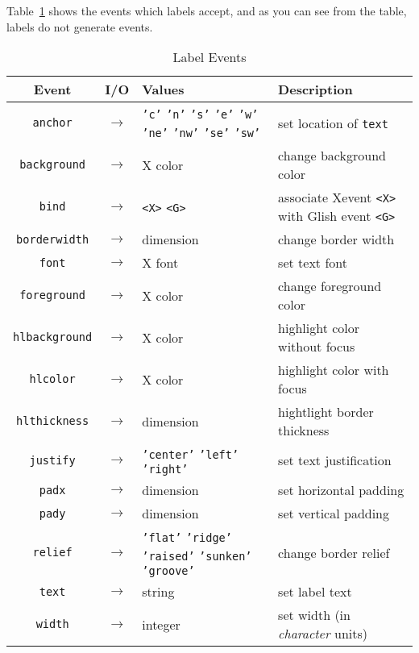 Table~\ref{tklabel-events} shows the events which labels accept, and as you can
see from the table, labels do not generate events.

\begin{table}[tbh]
{\small
\begin{center}
\begin{tabular}{|c|c|p{1.7in}|p{2.0in}|}
\hline
Event & I/O & Values & Description \\
\hline
\hline
{\tt anchor}    &$\rightarrow$& {\tt 'c'} {\tt 'n'} {\tt 's'} {\tt 'e'} {\tt 'w'} {\tt 'ne'} {\tt 'nw'} {\tt 'se'} {\tt 'sw'} & set location of {\tt text} \\ \hline
{\tt background}&$\rightarrow$& X color & change background color \\ \hline
{\tt bind}	&$\rightarrow$&\verb+<X>+ \verb+<G>+& associate Xevent \verb+<X>+ with Glish event \verb+<G>+ \\ \hline
{\tt borderwidth}&$\rightarrow$& dimension & change border width \\ \hline
{\tt font}	&$\rightarrow$& X font & set text font \\ \hline
{\tt foreground}&$\rightarrow$& X color & change foreground color \\ \hline
{\tt hlbackground}&$\rightarrow$& X color & highlight color without focus \\ \hline
{\tt hlcolor}	&$\rightarrow$& X color & highlight color with focus \\ \hline
{\tt hlthickness}&$\rightarrow$& dimension & hightlight border thickness \\ \hline
{\tt justify}	&$\rightarrow$& {\tt 'center'} {\tt 'left'} {\tt 'right'} & set text justification \\ \hline
{\tt padx}	&$\rightarrow$& dimension & set horizontal padding \\ \hline
{\tt pady}	&$\rightarrow$& dimension & set vertical padding \\ \hline
{\tt relief}	&$\rightarrow$& {\tt 'flat'} {\tt 'ridge'} {\tt 'raised'} {\tt 'sunken'} {\tt 'groove'} & change border relief \\ \hline
{\tt text}	&$\rightarrow$& string & set label text \\ \hline
{\tt width}	&$\rightarrow$& integer & set width (in {\em character} units) \\ \hline
\end{tabular}
\end{center}
}
\caption{ Label Events }
\label{tklabel-events}
\end{table}


